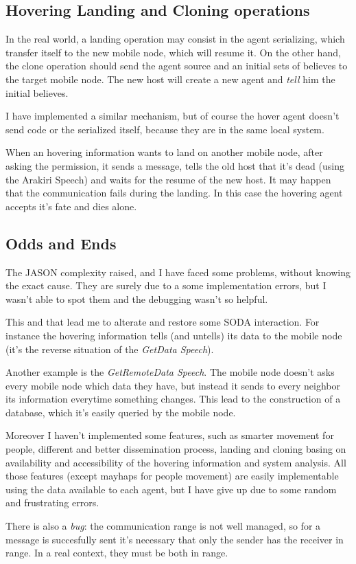 \subsection{Hovering Landing and Cloning operations}

In the real world, a landing operation may consist in the agent serializing,
which transfer itself to the new mobile node, which will resume it. On the
other hand, the clone operation should send the agent source and an initial
sets of believes to the target mobile node. The new host will create a new
agent and \emph{tell} him the initial believes.

I have implemented a similar mechanism, but of course the hover agent doesn't
send code or the serialized itself, because they are in the same local system.

When an hovering information wants to land on another mobile node, after asking
the permission, it sends a message, tells the old host that it's dead (using
the Arakiri Speech) and waits for the resume of the new host. It may happen
that the communication fails during the landing. In this case the hovering
agent accepts it's fate and dies alone.

\subsection{Odds and Ends}

The JASON complexity raised, and I have faced some problems, without knowing
the exact cause. They are surely due to a some implementation errors, but I
wasn't able to spot them and the debugging wasn't so helpful. 

This and that lead me to alterate and restore some SODA interaction. For
instance the hovering information tells (and untells) its data to the mobile
node (it's the reverse situation of the \emph{GetData Speech}).

Another example is the \emph{GetRemoteData Speech}. The mobile node doesn't
asks every mobile node which data they have, but instead it sends to every
neighbor its information everytime something changes. This lead to the
construction of a database, which it's easily queried by the mobile node.

Moreover I haven't implemented some features, such as smarter movement for
people, different and better dissemination process, landing and cloning basing
on availability and accessibility of the hovering information and system
analysis. All those features (except mayhaps for people movement) are easily
implementable using the data available to each agent, but I have give up due to
some random and frustrating errors.

There is also a \emph{bug}: the communication range is not well managed, so for
a message is succesfully sent it's necessary that only the sender has the
receiver in range. In a real context, they must be both in range.

